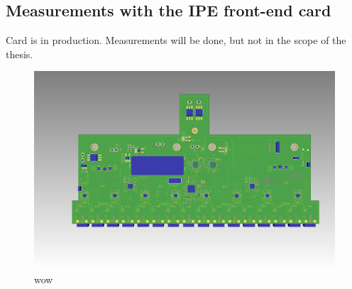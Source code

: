 \subsection{Measurements with the IPE front-end card}
Card is in production. Measurements will be done, but not in the scope of the thesis.
\begin{figure}[H]
	\centering
	\includegraphics[width = \textwidth]{chap/05-conclusion/img/board_ugly}
	\caption{wow}
	\label{fig:board}
\end{figure}

